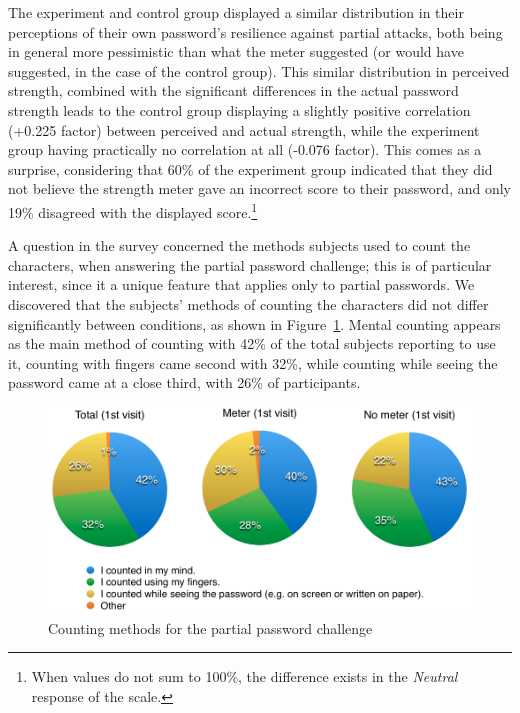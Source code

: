     The experiment and control group displayed a similar distribution in their perceptions of their own password's resilience against partial attacks, both being in general more pessimistic than what the meter suggested (or would have suggested, in the case of the control group). This similar distribution in perceived strength, combined with the significant differences in the actual password strength leads to the control group displaying a slightly positive correlation (+0.225 factor) between perceived and actual strength, while the experiment group having practically no correlation at all (-0.076 factor). This comes as a surprise, considering that 60\% of the experiment group indicated that they did not believe the strength meter gave an incorrect score to their password, and only 19\% disagreed with the displayed score.\footnote{When values do not sum to 100\%, the difference exists in the \emph{Neutral} response of the scale.}

    A question in the survey concerned the methods subjects used to count the characters, when answering the partial password challenge; this is of particular interest, since it a unique feature that applies only to partial passwords. We discovered that the subjects' methods of counting the characters did not differ significantly between conditions, as shown in Figure~\ref{fig:counting-methods}. Mental counting appears as the main method of counting with 42\% of the total subjects reporting to use it, counting with fingers came second with 32\%, while counting while seeing the password came at a close third, with 26\% of participants.

    \begin{figure}[htpb]
      \centering
      \includegraphics[width=\textwidth]{Images/counting}
      \caption{Counting methods for the partial password challenge}
      \label{fig:counting-methods}
    \end{figure}


